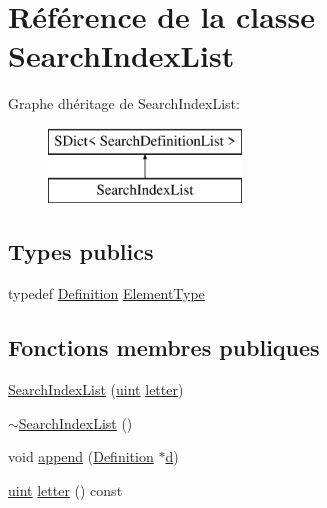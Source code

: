 \hypertarget{class_search_index_list}{}\section{Référence de la classe Search\+Index\+List}
\label{class_search_index_list}
Graphe d\textquotesingle{}héritage de Search\+Index\+List\+:\begin{figure}[H]
\begin{center}
\leavevmode
\includegraphics[height=2.000000cm]{class_search_index_list}
\end{center}
\end{figure}
\subsection*{Types publics}
\begin{DoxyCompactItemize}
\item 
typedef \hyperlink{class_definition}{Definition} \hyperlink{class_search_index_list_ab904fde1ec29986b9356cf264b4cebb0}{Element\+Type}
\end{DoxyCompactItemize}
\subsection*{Fonctions membres publiques}
\begin{DoxyCompactItemize}
\item 
\hyperlink{class_search_index_list_a801319ef8a3dfc96ca9291e0e1fb74bd}{Search\+Index\+List} (\hyperlink{qglobal_8h_a4d3943ddea65db7163a58e6c7e8df95a}{uint} \hyperlink{class_search_index_list_a620419a9d6daa5896820862560fa5683}{letter})
\item 
\hyperlink{class_search_index_list_ae7aa30cf8fc45ff0b7999bed31ae164b}{$\sim$\+Search\+Index\+List} ()
\item 
void \hyperlink{class_search_index_list_af22db636c52e9ba4ea18215b49037477}{append} (\hyperlink{class_definition}{Definition} $\ast$\hyperlink{060__command__switch_8tcl_af43f4b1f0064a33b2d662af9f06d3a00}{d})
\item 
\hyperlink{qglobal_8h_a4d3943ddea65db7163a58e6c7e8df95a}{uint} \hyperlink{class_search_index_list_a620419a9d6daa5896820862560fa5683}{letter} () const 
\end{DoxyCompactItemize}



